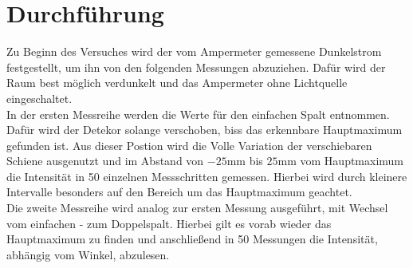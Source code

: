 \section{Durchführung}
Zu Beginn des Versuches wird der vom Ampermeter gemessene Dunkelstrom festgestellt, um ihn von den folgenden Messungen abzuziehen.
Dafür wird der Raum best möglich verdunkelt und das Ampermeter ohne Lichtquelle eingeschaltet.
\\ 
\newline
In der ersten Messreihe werden die Werte für den einfachen Spalt entnommen. Dafür wird der Detekor solange verschoben, biss das erkennbare Hauptmaximum 
gefunden ist. Aus dieser Postion wird die Volle Variation der verschiebaren Schiene ausgenutzt und im Abstand von $-25 \si{\mm}$ bis 
$25 \si{\mm}$ vom Hauptmaximum die Intensität in 50 einzelnen Messschritten gemessen. 
Hierbei wird durch kleinere Intervalle besonders auf den Bereich um das Hauptmaximum geachtet.
\\
\newline
Die zweite Messreihe wird analog zur ersten Messung ausgeführt, mit Wechsel vom einfachen - zum Doppelspalt.
Hierbei gilt es vorab wieder das Hauptmaximum zu finden und anschließend in 50 Messungen die Intensität, abhängig vom Winkel,
abzulesen. 